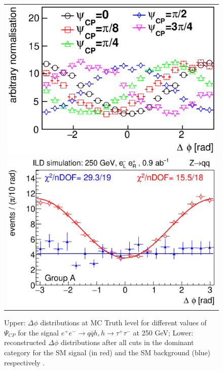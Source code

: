 \begin{figure}
\begin{tabular}[c]{c}
\includegraphics[width=0.85\hsize]{chapters/figures/ZH_qqtautau250_CP1.eps} \\
\includegraphics[width=0.85\hsize]{chapters/figures/ZH_qqtautau250_CP2.eps}
\end{tabular}
  \caption{Upper: $\Delta\phi$ distributions at MC Truth level for different 
  values of $\Psi_{CP}$ for the signal $e^+e^-\to q\bar{q} h, h\to\tau^+\tau^-$ at 250 GeV;
  Lower: reconstructed $\Delta\phi$ distributions after all cuts in the dominant category
  for the SM signal (in red) and the SM background (blue) respectively \cite{Jeans:2018anq}.}
  \label{fig:qqHtautauCP}
\end{figure}


